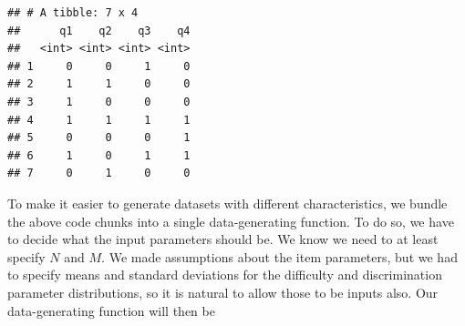 \documentclass[
]{book}
\begin{document}
\begin{verbatim}
## # A tibble: 7 x 4
##      q1    q2    q3    q4
##   <int> <int> <int> <int>
## 1     0     0     1     0
## 2     1     1     0     0
## 3     1     0     0     0
## 4     1     1     1     1
## 5     0     0     0     1
## 6     1     0     1     1
## 7     0     1     0     0
\end{verbatim}

To make it easier to generate datasets with different characteristics, we bundle the above code chunks into a single data-generating function.
To do so, we have to decide what the input parameters should be.
We know we need to at least specify \(N\) and \(M\).
We made assumptions about the item parameters, but we had to specify means and standard deviations for the difficulty and discrimination parameter distributions, so it is natural to allow those to be inputs also.
Our data-generating function will then be
\end{document}
